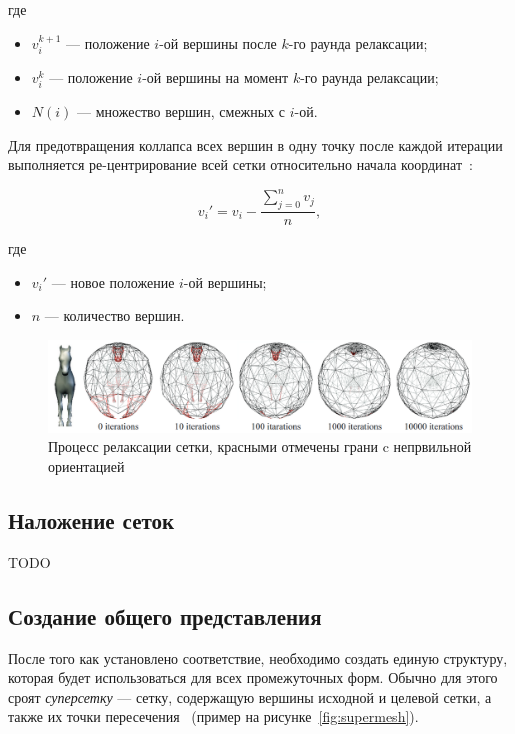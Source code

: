 	где
	\begin{itemize}
		\item $v_i^{k + 1}$ --- положение $i$-ой вершины после $k$-го раунда релаксации;
		\item $v_i^{k}$ --- положение $i$-ой вершины на момент $k$-го раунда релаксации;
		\item $N(i)$ --- множество вершин, смежных с $i$-ой.
	\end{itemize}
	
	Для предотвращения коллапса всех вершин в одну точку после каждой итерации выполняется ре-центрирование всей сетки относительно начала координат~\cite{alexa}:
	
	\begin{equation}
		v_i' = v_i - \frac{\sum_{j = 0}^{n} v_j}{n},
	\end{equation}
	
	где
	\begin{itemize}
		\item $v_i'$ --- новое положение $i$-ой вершины;
		\item $n$ --- количество вершин.
	\end{itemize}
	
	\begin{figure}[H]
		\centering
		\includegraphics[width=\textwidth]{../inc/images/relaxation}
		\caption{Процесс релаксации сетки, красными отмечены грани c непрвильной ориентацией}
		\label{fig:relaxation}
	\end{figure}
	
	\subsection{Наложение сеток}
	TODO
	
    \subsection{Создание общего представления}
    После того как установлено соответствие, необходимо создать единую структуру, которая будет использоваться для всех промежуточных форм. Обычно для этого сроят \textit{суперсетку} --- сетку, содержащую вершины исходной и целевой сетки, а также их точки пересечения~\cite{mocanu,alexa} (пример на рисунке~\ref{fig:supermesh}).
    

